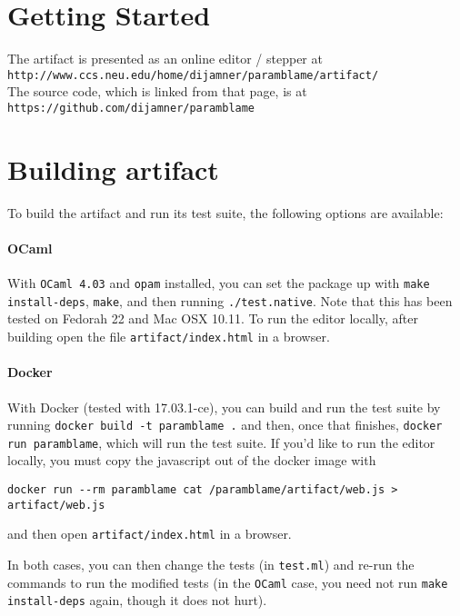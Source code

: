 \documentclass[11pt,numbers,nocopyrightspace,acmlarge,anonymous]{acmart}
\begin{document}
\section{Getting Started}

The artifact is presented as an online editor / stepper at\\

\verb|http://www.ccs.neu.edu/home/dijamner/paramblame/artifact/| \\

\noindent The source code, which is linked from that page, is at\\

\verb|https://github.com/dijamner/paramblame| 

\section{Building artifact}

To build the artifact and run its test suite, the following options
are available:

\paragraph{OCaml} With \verb|OCaml 4.03| and \verb|opam| installed,
you can set the package up with \verb|make install-deps|, \verb|make|,
and then running \verb|./test.native|. Note that this has been tested
on Fedorah 22 and Mac OSX 10.11. To run the editor locally,
after building open the file \verb|artifact/index.html| in a browser.

\paragraph{Docker} With Docker (tested with 17.03.1-ce), you can build and
run the test suite by running 
\verb|docker build -t paramblame .| 
and then, once that finishes, \verb|docker run paramblame|, which will run the test
suite. If you'd like to run the editor locally, you must copy the
javascript out of the docker image with

\verb|docker run --rm paramblame cat /paramblame/artifact/web.js > artifact/web.js| 

\noindent and then open \verb|artifact/index.html| in a browser.

In both cases, you can then change the tests (in \verb|test.ml|) and
re-run the commands to run the modified tests (in the \verb|OCaml|
case, you need not run \verb|make install-deps| again, though it does
not hurt).
\end{document}
